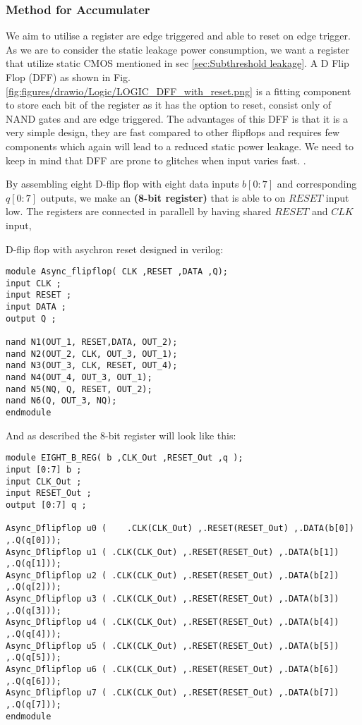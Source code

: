 \subsubsection{Method for Accumulater}
We aim to utilise a register are edge triggered and able to reset on edge trigger. As we are to consider the static leakage power consumption, we want a register that utilize static CMOS mentioned in sec \ref{sec:Subthreshold leakage}. A D Flip Flop (DFF) as shown in Fig. \ref{fig:figures/drawio/Logic/LOGIC_DFF_with_reset.png} is a fitting component to store each bit of the register as it has the option to reset, consist only of NAND gates and are edge triggered. The advantages of this DFF is that it is a very simple design, they are fast compared to other flipflops and requires few components which again will lead to a reduced static power leakage. We need to keep in mind that DFF are prone to glitches when input varies fast. \cite{a2023_d}.

By assembling eight D-flip flop with eight data inputs $b[0:7]$ and corresponding $q[0:7]$ outputs, we make an \textbf{(8-bit register)} that is able to on $RESET$ input low. The registers are connected in parallell by having shared $RESET$ and $CLK$ input,


D-flip flop with asychron reset designed in verilog:
\begin{lstlisting}
module Async_flipflop( CLK ,RESET ,DATA ,Q);
input CLK ;
input RESET ;
input DATA ;
output Q ;

nand N1(OUT_1, RESET,DATA, OUT_2);
nand N2(OUT_2, CLK, OUT_3, OUT_1);
nand N3(OUT_3, CLK, RESET, OUT_4);
nand N4(OUT_4, OUT_3, OUT_1);
nand N5(NQ, Q, RESET, OUT_2);
nand N6(Q, OUT_3, NQ);
endmodule
\end{lstlisting}
And as described the 8-bit register will look like this:

\begin{lstlisting}
module EIGHT_B_REG( b ,CLK_Out ,RESET_Out ,q );
input [0:7] b ;
input CLK_Out ;
input RESET_Out ;
output [0:7] q ;

Async_Dflipflop u0 (	.CLK(CLK_Out) ,.RESET(RESET_Out) ,.DATA(b[0]) ,.Q(q[0])); 
Async_Dflipflop u1 ( .CLK(CLK_Out) ,.RESET(RESET_Out) ,.DATA(b[1]) ,.Q(q[1]));
Async_Dflipflop u2 ( .CLK(CLK_Out) ,.RESET(RESET_Out) ,.DATA(b[2]) ,.Q(q[2]));
Async_Dflipflop u3 ( .CLK(CLK_Out) ,.RESET(RESET_Out) ,.DATA(b[3]) ,.Q(q[3]));
Async_Dflipflop u4 ( .CLK(CLK_Out) ,.RESET(RESET_Out) ,.DATA(b[4]) ,.Q(q[4]));
Async_Dflipflop u5 ( .CLK(CLK_Out) ,.RESET(RESET_Out) ,.DATA(b[5]) ,.Q(q[5]));
Async_Dflipflop u6 ( .CLK(CLK_Out) ,.RESET(RESET_Out) ,.DATA(b[6]) ,.Q(q[6]));
Async_Dflipflop u7 ( .CLK(CLK_Out) ,.RESET(RESET_Out) ,.DATA(b[7]) ,.Q(q[7]));
endmodule
\end{lstlisting}

